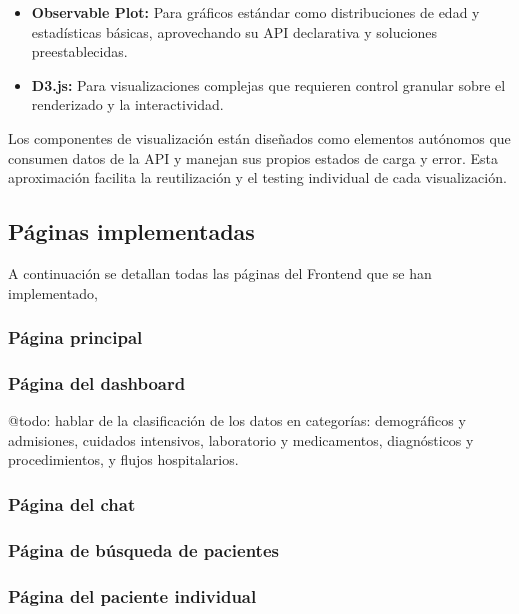 \begin{itemize}
\item \textbf{Observable Plot:} Para gráficos estándar como distribuciones de edad y estadísticas básicas, aprovechando su API declarativa y soluciones preestablecidas.
\item \textbf{D3.js:} Para visualizaciones complejas que requieren control granular sobre el renderizado y la interactividad.
\end{itemize}

Los componentes de visualización están diseñados como elementos autónomos que consumen datos de la API y manejan sus propios estados de carga y error. Esta aproximación facilita la reutilización y el testing individual de cada visualización.


\subsection{Páginas implementadas}

A continuación se detallan todas las páginas del Frontend que se han implementado, 

\subsubsection{Página principal}

\subsubsection{Página del dashboard}

@todo: hablar de la clasificación de los datos en categorías: demográficos y admisiones, cuidados intensivos, laboratorio y medicamentos, diagnósticos y procedimientos, y flujos hospitalarios.

\subsubsection{Página del chat}

\subsubsection{Página de búsqueda de pacientes}

\subsubsection{Página del paciente individual}

